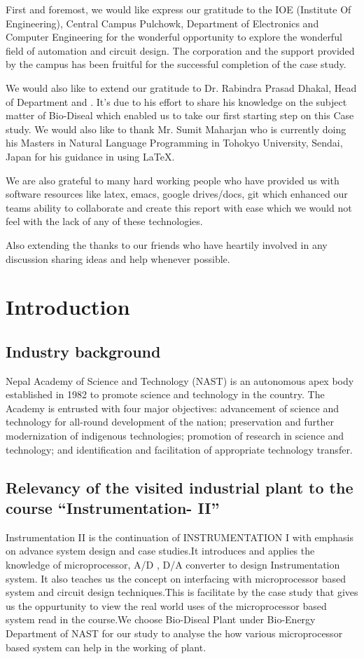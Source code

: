 \documentclass[12pt]{article}
\begin{document}
First and foremost, we would like express our gratitude to the IOE (Institute Of Engineering), Central Campus Pulchowk, Department of Electronics and Computer Engineering for the wonderful opportunity to explore the wonderful field of automation and circuit design. The corporation and the support provided by the campus has been fruitful for the successful completion of the case study.
\par
We would also like to extend our gratitude to Dr. Rabindra Prasad Dhakal, Head of Department and . It's due to his effort to share his knowledge on the subject matter of Bio-Diseal which enabled us to take our first starting step on this Case study. We would also like to thank  Mr. Sumit Maharjan who is currently doing his Masters in Natural Language Programming in Tohokyo University, Sendai, Japan for his guidance in using LaTeX.\par
We are also grateful to many hard working people who have provided us with software resources like latex, emacs, google drives/docs, git which enhanced our teams ability to collaborate and create this report with ease which we would not feel with the lack of any of these technologies.
\par
Also extending the thanks to our friends who have heartily involved in any discussion sharing ideas and help whenever possible.

\newpage



\tableofcontents
\newpage
\renewcommand{\thesection}{\arabic{section}} 
\section{Introduction}
\subsection{Industry background}
Nepal Academy of Science and Technology (NAST) is an autonomous apex body established in 1982 to promote science and technology in the country. The Academy is entrusted with four major objectives: advancement of science and technology for all-round development of the nation; preservation and further modernization of indigenous technologies; promotion of research in science and technology; and identification and facilitation of appropriate technology transfer.
\subsection{Relevancy of the visited industrial plant to the course    “Instrumentation- II” }
Instrumentation II is the continuation of INSTRUMENTATION I with emphasis on advance system design and case studies.It introduces and applies the knowledge of microprocessor, A/D , D/A converter to design Instrumentation system. It also teaches us the concept on interfacing with microprocessor based system and circuit design techniques.This is facilitate by the case study that gives us the oppurtunity to view the real world uses of the microprocessor based system read in the course.We choose Bio-Diseal Plant under Bio-Energy Department of NAST for our study to analyse the how various microprocessor based system can help in the working of plant.
\end{document}
